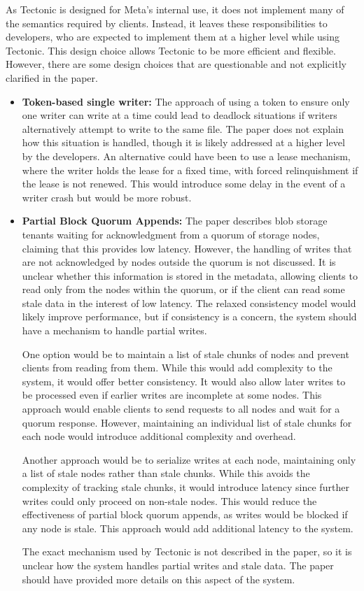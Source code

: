 As Tectonic is designed for Meta's internal use, it does not implement many of the semantics required by clients. Instead, it leaves these responsibilities to developers, who are expected to implement them at a higher level while using Tectonic. This design choice allows Tectonic to be more efficient and flexible. However, there are some design choices that are questionable and not explicitly clarified in the paper.

\begin{itemize}
    \item \textbf{Token-based single writer:} The approach of using a token to ensure only one writer can write at a time could lead to deadlock situations if writers alternatively attempt to write to the same file. The paper does not explain how this situation is handled, though it is likely addressed at a higher level by the developers. An alternative could have been to use a lease mechanism, where the writer holds the lease for a fixed time, with forced relinquishment if the lease is not renewed. This would introduce some delay in the event of a writer crash but would be more robust.
    
    \item \textbf{Partial Block Quorum Appends:} The paper describes blob storage tenants waiting for acknowledgment from a quorum of storage nodes, claiming that this provides low latency. However, the handling of writes that are not acknowledged by nodes outside the quorum is not discussed. It is unclear whether this information is stored in the metadata, allowing clients to read only from the nodes within the quorum, or if the client can read some stale data in the interest of low latency. The relaxed consistency model would likely improve performance, but if consistency is a concern, the system should have a mechanism to handle partial writes.

    One option would be to maintain a list of stale chunks of nodes and prevent clients from reading from them. While this would add complexity to the system, it would offer better consistency. It would also allow later writes to be processed even if earlier writes are incomplete at some nodes. This approach would enable clients to send requests to all nodes and wait for a quorum response. However, maintaining an individual list of stale chunks for each node would introduce additional complexity and overhead.

    Another approach would be to serialize writes at each node, maintaining only a list of stale nodes rather than stale chunks. While this avoids the complexity of tracking stale chunks, it would introduce latency since further writes could only proceed on non-stale nodes. This would reduce the effectiveness of partial block quorum appends, as writes would be blocked if any node is stale. This approach would add additional latency to the system.
    
    The exact mechanism used by Tectonic is not described in the paper, so it is unclear how the system handles partial writes and stale data. The paper should have provided more details on this aspect of the system.
\end{itemize}

